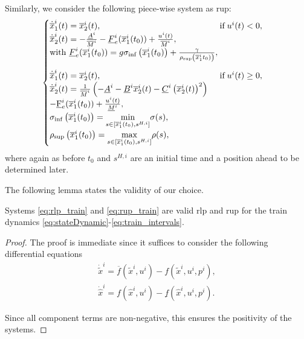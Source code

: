 Similarly, we consider the following piece-wise system as \gls{rup}:
\begin{equation}\label{eq:rup_train}
	\begin{cases}
		\dot{\overline{x}}_1^i(t) =   \overline{x}_2^i(t), \qquad  \qquad \qquad \qquad \qquad \qquad  \qquad  \text{if} \; u^i(t) < 0,  \\
		\dot{\overline{x}}_2^i(t) =  -\frac{\underline{A}^i}{\overline{M}^i}-\underline{F}_e^i(\overline{x}^i_1(t_0)) + \frac{u^i(t)}{\overline{M}^i}, \\
		\textrm{with } \underline{F}_e^i(\overline{x}^i_1(t_0)) =  g \sigma_{\inf}\left(\overline{x}^i_1(t_0)\right)+ \frac{\gamma}{\rho_{\sup}\left(\overline{x}^i_1t_0)\right)}, \\
		\noalign{\vskip9pt}
		\dot{\overline{x}}_1^i(t) =   \overline{x}_2^i(t), \qquad \qquad \qquad  \qquad \qquad \qquad \qquad \text{if} \; u^i(t) \geq 0,  \\
		\dot{\overline{x}}_2^i(t) =  \frac{1}{\overline{M}^i} \left(-\underline{A}^i - \underline{B}^i \overline{x}^i_2(t) -  \underline{C}^i \left(\overline{x}^i_2(t)\right)^2 \right) \\
		-  \underline{\mathrm{F}}_e^i(\overline{x}^i_1(t_0))  + \frac{u^i(t)}{\underline{M}^i}, \\
		\sigma_{\inf}\left(\overline{x}^i_1(t_0)\right) = \underset{s \in [\overline{x}_1^i(t_0),s^{H,i}]}{\min} \sigma(s), \\
		\rho_{\sup}\left(\overline{x}^i_1(t_0)\right) = \underset{s \in [\overline{x}_1^i(t_0),s^{H,i}]}{\max} \rho(s),
	\end{cases}
\end{equation}
where again as before $t_0$ and $s^{H,i}$ are an initial time and a position ahead to be determined later.   




The following lemma states the validity of our choice. 

\begin{lemma} \label{lemma:Proxies}
	Systems \eqref{eq:rlp_train} and \eqref{eq:rup_train} are valid \gls{rlp} and \gls{rup} for the train dynamics \eqref{eq:stateDynamic}\--\eqref{eq:train_intervals}. 
	\begin{proof}
		The proof is immediate since it suffices to consider the 
		following differential equations
		\begin{align*}
			\dot{\tilde{x}}^i = \overline{f}\left(\tilde{x}^i, u^i \right) - f\left(\tilde{x}^i, u^i, p^i \right), \\
			\dot{\hat{x}}^i = f\left(\hat{x}^i, u^i \right) - \underline{f}\left(\hat{x}^i, u^i, p^i \right).
		\end{align*}
		
		Since all component terms are non-negative, this ensures the positivity of the systems.
		
	\end{proof}
\end{lemma}





